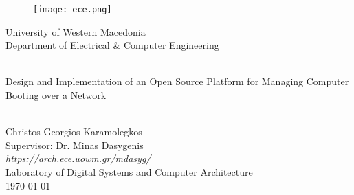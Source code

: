 \begin{titlepage}
	\setcounter{page}{3}
	\begin{center}
		\begin{figure}[h]
			\centering \texttt{[image: ece.png]}
		\end{figure}
		{\LARGE University of Western Macedonia\\}
		{\Large Department of Electrical \& Computer Engineering}

		\begin{center}
			\vspace{2cm}
			\HRule \\[0.4cm]
			{\huge Design and Implementation of an Open Source Platform for Managing Computer Booting over a Network\\}
			\HRule \\[0.4cm]
		\end{center}

		\vfill
		\begin{doublespacing}
			{\LARGE Christos-Georgios Karamolegkos\\}
			{\Large Supervisor: Dr. Minas Dasygenis\\}
			{\Large \href{https://arch.ece.uowm.gr/mdasyg/}{\textit{https://arch.ece.uowm.gr/mdasyg/}}\\}
			{\Large Laboratory of Digital Systems and Computer Architecture\\}
			\vfill
			{\Large \today}
		\end{doublespacing}
	\end{center}
	\newpage
	\thispagestyle{empty}
	\mbox{}
\end{titlepage}









\newpage\tableofcontents

\listoffigures
\clearpage



